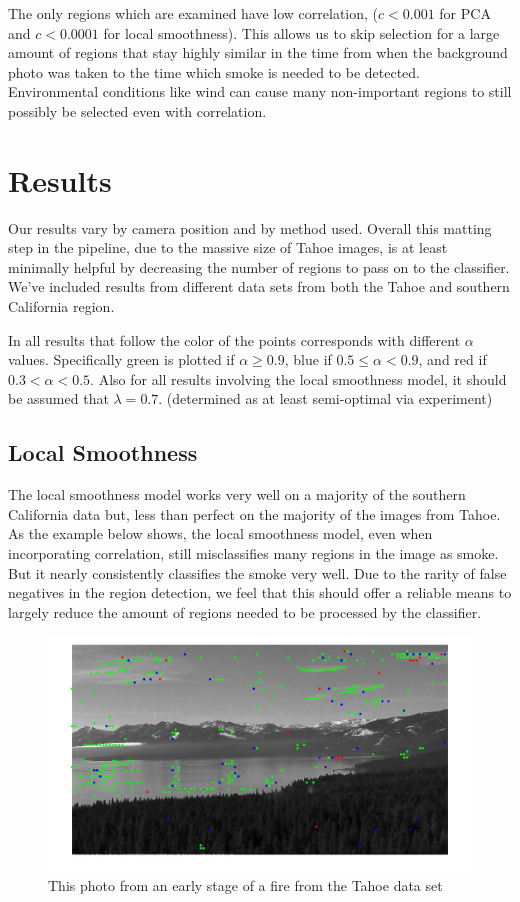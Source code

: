 \documentclass[12pt]{article}
\begin{document}
The only regions which are examined have low correlation, ($c < 0.001$ for PCA and $c < 0.0001$ for local smoothness). This allows us to skip selection for a large amount of regions that stay highly similar in the time from when the background photo was taken to the time which smoke is needed to be detected. Environmental conditions like wind can cause many non-important regions to still possibly be selected even with correlation. 

\section{Results}
Our results vary by camera position and by method used. Overall this matting step in the pipeline, due to the massive size of Tahoe images, is at least minimally helpful by decreasing the number of regions to pass on to the classifier. We've included results from different data sets from both the Tahoe and southern California region. 

In all results that follow the color of the points corresponds with different $\alpha$ values. Specifically green is plotted if $\alpha \geq 0.9$, blue if $0.5 \leq \alpha < 0.9$, and red if $0.3 < \alpha < 0.5$. Also for all results involving the local smoothness model, it should be assumed that $\lambda = 0.7$. (determined as at least semi-optimal via experiment)   

\subsection{Local Smoothness}
The local smoothness model works very well on a majority of the southern California data but, less than perfect on the majority of the images from Tahoe. As the example below shows, the local smoothness model, even when incorporating correlation, still misclassifies many regions in the image as smoke. But it nearly consistently classifies the smoke very well. Due to the rarity of false negatives in the region detection, we feel that this should offer a reliable means to largely reduce the amount of regions needed to be processed by the classifier. 
 

\begin{figure}[H]
\centering
\includegraphics[scale=.2]{LSTahoeHard.jpg}
\caption{This photo from an early stage of a fire from the Tahoe data set}
\end{figure}
\end{document}
